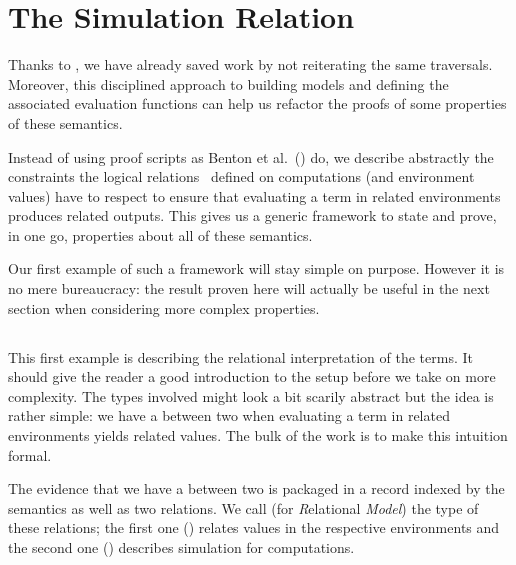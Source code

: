 \chapter{The Simulation Relation}

Thanks to , we have already saved work by not reiterating the same traversals.
Moreover, this disciplined approach to building models and
defining the associated evaluation functions can help us refactor
the proofs of some properties of these semantics.

Instead of using proof scripts as Benton et al.~(\citeyear{benton2012strongly})
do, we describe abstractly the constraints the logical relations~\cite{reynolds1983types}
defined on computations (and environment values) have to respect to ensure
that evaluating a term in related environments
produces related outputs. This gives us a generic framework to
state and prove, in one go, properties about all of these semantics.

Our first example of such a framework will stay simple on purpose.
However it is no mere bureaucracy: the
result proven here will actually be useful in the next section
when considering more complex properties.

\section{}

This first example is describing the relational interpretation
of the terms. It should give the reader a good introduction to
the setup before we take on more complexity. The types
involved might look a bit scarily abstract but the idea is rather simple:
we have a  between
two  when evaluating a term in related environments yields
related values. The bulk of the work is to make this intuition formal.

The evidence that we have a  between two  is
packaged in a record indexed by the semantics as well as two relations.
We call  (for \emph{R}elational \emph{Model}) the type of these
relations; the first one () relates values in the respective environments
and the second one () describes simulation for computations.
